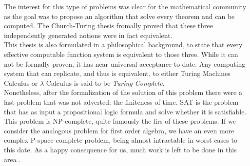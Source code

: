 The interest for this type of problems was clear for the mathematical community as the goal was to propose an algorithm that solve every theorem and can be computed. The Church-Turing thesis fromally proved that these three independently generated notions were in fact equivalent\cite{copeland1997church}.\\


This thesis is also formulated in a philosophical background, to state that every effective computable function system is equivalent to those three. While it can not be formally proven, it has near-universal acceptance to date. Any computing system that can replicate, and thus is equivalent, to either Turing Machines Calculus or $\lambda$-Calculus is said to be \emph{Turing Complete}.\\

Nonetheless, after the formalization of the solution of this problem there were a last problem that was not adverted: the finiteness of time. SAT is the problem that has as input a propositional logic formula and solve whether it is satisfiable. This problem is NP-complete, quite famously the firs of these problems\cite{cook1971complexity}. If we consider the analogous problem for first order algebra, we have an even more complex P-space-complete problem, being almost intractable in worst cases to this date. As a happy consequence for us, much work is left to be done in this area \cite{cook2006p}. 

